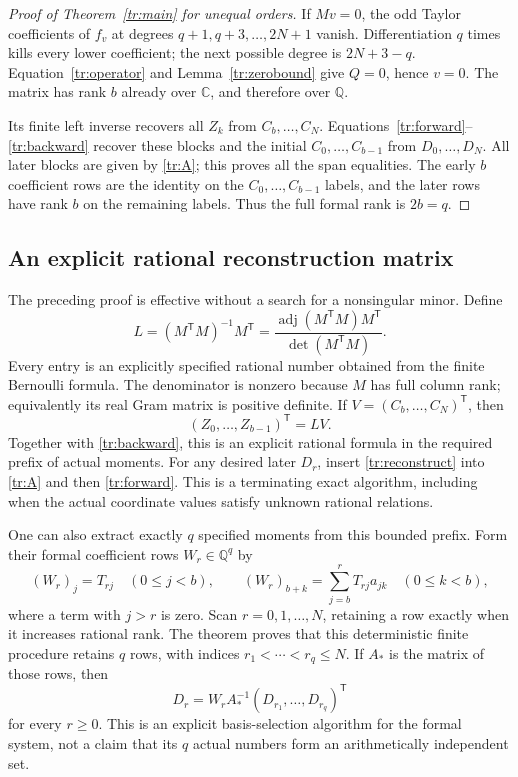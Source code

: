 \documentclass[11pt,a4paper]{article}
\numberwithin{equation}{section}
\theoremstyle{definition}
\begin{document}
\begin{proof}[Proof of Theorem~\ref{tr:main} for unequal orders]
If $Mv=0$, the odd Taylor coefficients of $f_v$ at degrees
$q+1,q+3,\ldots,2N+1$ vanish. Differentiation $q$ times kills every
lower coefficient; the next possible degree is $2N+3-q$.
Equation~\eqref{tr:operator} and Lemma~\ref{tr:zerobound} give $Q=0$,
hence $v=0$. The matrix has rank $b$ already over $\mathbb C$, and
therefore over $\mathbb Q$.

Its finite left inverse recovers all $Z_k$ from $C_b,\ldots,C_N$.
Equations~\eqref{tr:forward}--\eqref{tr:backward} recover these blocks
and the initial $C_0,\ldots,C_{b-1}$ from $D_0,\ldots,D_N$.
All later blocks are given by \eqref{tr:A}; this proves all the span
equalities. The early $b$ coefficient rows are the identity on the
$C_0,\ldots,C_{b-1}$ labels, and the later rows have rank $b$ on
the remaining labels. Thus the full formal rank is $2b=q$.
\end{proof}

\subsection{An explicit rational reconstruction matrix}

The preceding proof is effective without a search for a nonsingular
minor. Define
\begin{equation}\label{tr:leftinverse}
 L=(M^{\mathsf T}M)^{-1}M^{\mathsf T}
   =\frac{\operatorname{adj}(M^{\mathsf T}M)M^{\mathsf T}}
          {\det(M^{\mathsf T}M)}.
\end{equation}
Every entry is an explicitly specified rational number obtained from
the finite Bernoulli formula. The denominator is nonzero because $M$
has full column rank; equivalently its real Gram matrix is positive
definite. If $V=(C_b,\ldots,C_N)^{\mathsf T}$, then
\begin{equation}\label{tr:reconstruct}
 (Z_0,\ldots,Z_{b-1})^{\mathsf T}=LV.
\end{equation}
Together with \eqref{tr:backward}, this is an explicit rational formula
in the required prefix of actual moments. For any desired later $D_r$,
insert \eqref{tr:reconstruct} into \eqref{tr:A} and then
\eqref{tr:forward}. This is a terminating exact algorithm, including
when the actual coordinate values satisfy unknown rational relations.

One can also extract exactly $q$ specified moments from this bounded
prefix. Form their formal coefficient rows $W_r\in\mathbb Q^q$ by
\[
 (W_r)_j=T_{rj}\quad(0\le j<b),\qquad
 (W_r)_{b+k}=\sum_{j=b}^r T_{rj}a_{jk}\quad(0\le k<b),
\]
where a term with $j>r$ is zero. Scan $r=0,1,\ldots,N$, retaining a
row exactly when it increases rational rank. The theorem proves that
this deterministic finite procedure retains $q$ rows, with indices
$r_1<\cdots<r_q\le N$. If $A_*$ is the matrix of those rows, then
\[
 D_r=W_rA_*^{-1}(D_{r_1},\ldots,D_{r_q})^{\mathsf T}
\]
for every $r\ge0$. This is an explicit basis-selection algorithm for
the formal system, not a claim that its $q$ actual numbers form an
arithmetically independent set.
\end{document}
